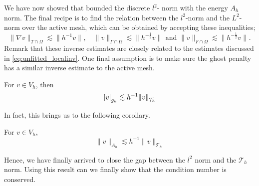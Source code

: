 We have now showed that bounded the discrete $l^{2}$- norm with the energy $A_{h}$ norm. The final recipe is to find the relation between the $l^{2}$-norm and the $L^{2}$-norm over the active mesh, which can be obtained by accepting these
inequalities;
\begin{equation}
\label{eq:zero_order_inverse_est}
    \| \nabla v \|_{ T\cap \Omega  }^{  }  \lesssim \| h^{-1} v \|_{  }^{  },\quad
    \|  v \|_{ \Gamma \cap \Omega  }^{  }  \lesssim \| h^{-\frac{1}{2}} v \|_{  }^{  } \text{  and  }
    \|  v \|_{ F \cap \Omega  }^{  }  \lesssim \| h^{-\frac{1}{2}} v \|_{  }^{  }.
\end{equation}
Remark that these inverse estimates are closely related to the estimates discussed in \eqref{eq:unfitted_localinv}. One final assumption is to make sure the ghost penalty has a similar inverse estimate to the active mesh.
\begin{assumption}[EP4]
    \label{as:est_EP4}
    For $v \in V_{h}$, then \[
    \left\lvert  v  \right\rvert _{g_{h}} \lesssim h^{-1} \| v \|_{ \mathcal{T} _{h} }^{  }
    \]
\end{assumption}

In fact, this brings us to the following corollary.
\begin{corollary}
    \label{cor:inverse_energy_norm}
    For $v \in V_{h}$, \[
    \| v \|_{ A_{h} }^{  } \lesssim  h^{-1}\| v \|_{ \mathcal{T} _{h} }^{  }
    \]
\end{corollary}

Hence, we have finally arrived to close the gap between the $l^{2}$ norm and the $\mathcal{T} _{h}$ norm. Using this result can we finally show that the condition number is conserved.

